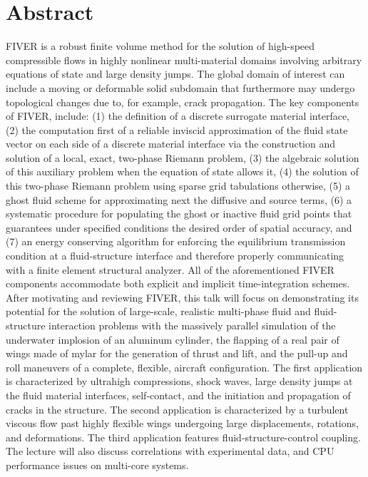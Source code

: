 \documentclass[article,A4,11pt]{llncs}%
\begin{document}
\section*{Abstract}
FIVER is a robust finite volume method for the solution of high-speed compressible flows in highly nonlinear multi-material domains involving arbitrary equations of state and large density jumps. The global domain of interest can include a moving or deformable solid subdomain that furthermore may undergo topological changes due to, for example, crack propagation. The key components of FIVER, include: (1) the definition of a discrete surrogate material interface, (2) the computation first of a reliable inviscid approximation of the fluid state vector on each side of a discrete material interface via the construction and solution of a local, exact, two-phase Riemann problem, (3) the algebraic solution of this auxiliary problem when the equation of state allows it, (4) the solution of this two-phase Riemann problem using sparse grid tabulations otherwise, (5) a ghost fluid scheme for approximating next the diffusive and source terms, (6) a systematic procedure for populating the ghost or inactive fluid grid points that guarantees under specified conditions the desired order of spatial accuracy, and (7) an energy conserving algorithm for enforcing the equilibrium transmission condition at a fluid-structure interface and therefore properly communicating with a finite element structural analyzer. All of the aforementioned FIVER components accommodate both explicit and implicit time-integration schemes. After motivating and reviewing FIVER, this talk will focus on demonstrating its potential for the solution of large-scale, realistic multi-phase fluid and fluid-structure interaction problems with the massively parallel simulation of the underwater implosion of an aluminum cylinder, the flapping of a real pair of wings made of mylar for the generation of thrust and lift, and the pull-up and roll maneuvers of a complete, flexible, aircraft configuration. The first application is characterized by ultrahigh compressions, shock waves, large density jumps at the fluid material interfaces, self-contact, and the initiation and propagation of cracks in the structure. The second application is characterized by a turbulent viscous flow past highly flexible wings undergoing large displacements, rotations, and deformations. The third application features fluid-structure-control coupling. The lecture will also discuss correlations with experimental data, and CPU performance issues on multi-core systems.
\end{document}
